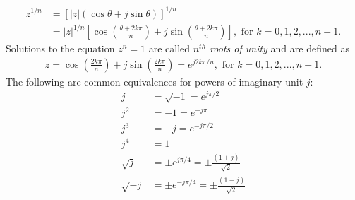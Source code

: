 \documentclass{report}
\begin{document}
\begin{align}
    z^{1/n} &= [|z|(\cos\theta + j\sin\theta)]^{1/n} \nonumber \\ 
    &= |z|^{1/n}\left[\cos\left(\frac{\theta+2k\pi}{n}\right)+j\sin\left(\frac{\theta+2k\pi}{n}\right)\right], \text{ for } k=0,1,2,...,n-1.
\end{align}
Solutions to the equation $z^n=1$ are called \emph{$n^{th}$ roots of unity} and are defined as 
\begin{align}
    z=\cos\left(\frac{2k\pi}{n}\right)+j\sin\left(\frac{2k\pi}{n}\right)=e^{j2k\pi/n}, \text{ for } k=0,1,2,...,n-1.
\end{align}
The following are common equivalences for powers of imaginary unit $j$:
\begin{align}
    j &= \sqrt{-1} = e^{j\pi/2} \\ 
    j^2 &= -1 = e^{-j\pi} \\
    j^3 &= -j = e^{-j \pi/2} \\
    j^4 &= 1 \\
    \sqrt{j} &= \pm e^{j\pi/4} = \pm \frac{(1+j)}{\sqrt{2}} \\
    \sqrt{-j} &= \pm e^{-j\pi/4} = \pm \frac{(1-j)}{\sqrt{2}}
\end{align}
\end{document}
